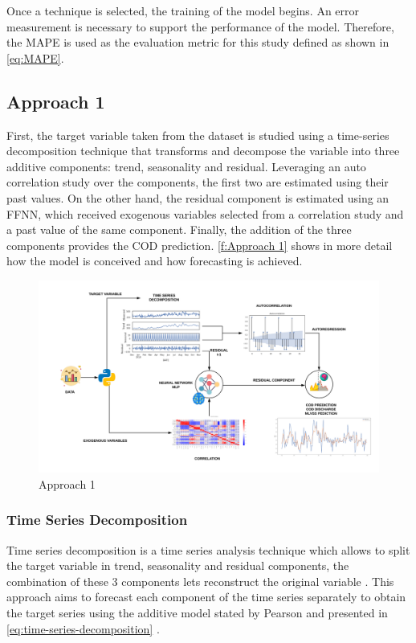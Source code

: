 Once a technique is selected, the training of the model begins. An error measurement is necessary to support the performance of the model. Therefore, the \ac{MAPE} is used as the evaluation metric for this study defined as shown in \autoref{eq:MAPE}.


\subsection{Approach 1}
\label{s:Approach1}

First, the target variable taken from the dataset is studied using a time-series decomposition technique that transforms and decompose the variable into three additive components: trend, seasonality and residual. Leveraging an auto correlation study over the components, the first two are estimated using their past values. On the other hand, the residual component is estimated using an \ac{FFNN}, which received exogenous variables selected from a correlation study and a past value of the same component. Finally, the addition of the three components provides the \ac{COD} prediction. \autoref{f:Approach 1} shows in more detail how the model is conceived and how forecasting is achieved.

\begin{figure}[h]
\centering
\includegraphics[width=\linewidth]{figures/Ch4/Approach1.png}
\caption{Approach 1}
\label{f:Approach 1}
\end{figure}

\subsubsection{Time Series Decomposition}

Time series decomposition is a time series analysis technique which allows to split the target variable in trend, seasonality and residual components, the combination of these 3 components lets reconstruct the original variable \cite{Cryer2008}. This approach aims to forecast each component of the time series separately to obtain the target series using the additive model stated by Pearson and presented in \autoref{eq:time-series-decomposition}
\cite{dagum2010time}.

